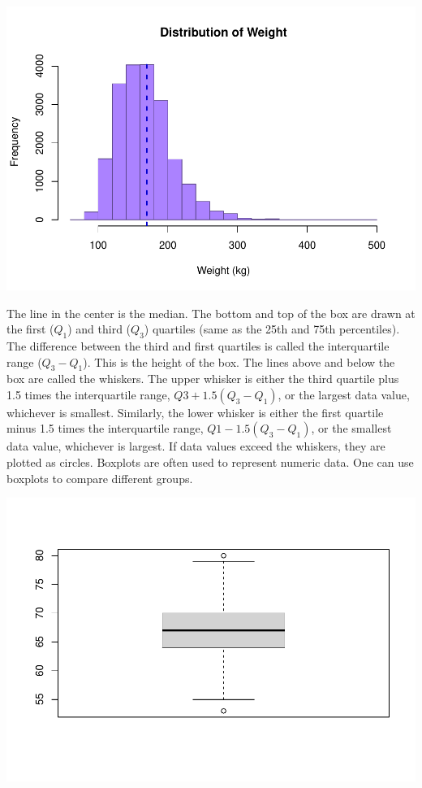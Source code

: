 \documentclass[
]{book}
\newenvironment{Shaded}{\begin{snugshade}}{\end{snugshade}}
\newcommand{\DecValTok}[1]{\textcolor[rgb]{0.00,0.00,0.81}{#1}}
\newcommand{\KeywordTok}[1]{\textcolor[rgb]{0.13,0.29,0.53}{\textbf{#1}}}
\newcommand{\NormalTok}[1]{#1}
\newcommand{\OperatorTok}[1]{\textcolor[rgb]{0.81,0.36,0.00}{\textbf{#1}}}
\newcommand{\StringTok}[1]{\textcolor[rgb]{0.31,0.60,0.02}{#1}}
\begin{document}
\includegraphics{_main_files/figure-latex/unnamed-chunk-133-1.pdf}

The line in the center is the median. The bottom and top of the box are drawn at the first (\(Q_1\)) and third (\(Q_3\)) quartiles (same as the 25th and 75th percentiles). The difference between the third and first quartiles is called the interquartile range (\(Q_3-Q_1\)). This is the height of the box. The lines above and below the box are called the whiskers. The upper whisker is either the third quartile plus 1.5 times the interquartile range, \(Q3 +1.5(Q_3-Q_1)\), or the largest data value, whichever is smallest. Similarly, the lower whisker is either the first quartile minus 1.5 times the interquartile range, \(Q1-1.5(Q_3-Q_1)\), or the smallest data value, whichever is largest. If data values exceed the whiskers, they are plotted as circles. Boxplots are often used to represent numeric data. One can use boxplots to compare different groups.

\begin{Shaded}
\end{Shaded}

\includegraphics{_main_files/figure-latex/unnamed-chunk-134-1.pdf}
\end{document}

